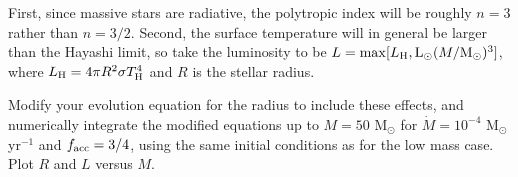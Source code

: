 \documentclass{article}
\newcommand{\msun}{\ensuremath{\mathrm{M}_\odot}\xspace}
\newcommand{\lsun}{\ensuremath{\mathrm{L}_\odot}\xspace}
\begin{document}
\begin{enumerate}
\begin{enumerate}
First, since massive stars are radiative, the
polytropic index will be roughly $n=3$ rather than $n=3/2$. Second, the
surface temperature will in general be larger than the Hayashi limit, so take
the luminosity to be $L=\max[L_{\rm H}, \lsun(M/\msun)^3]$, where $L_{\rm
H}=4\pi R^2 \sigma T_{\rm H}^4$ and $R$ is the stellar radius.

Modify your
evolution equation for the radius to include these effects, and numerically
integrate the modified equations up to $M=50$ $\msun$ for $\dot{M} = 10^{-4}$
$\msun$ yr$^{-1}$ and $f_{\rm acc}=3/4$, using the same initial conditions as
for the low mass case. Plot $R$ and $L$ versus $M$.
\end{enumerate}



% 

% 
%         


\end{enumerate}
\end{document}
